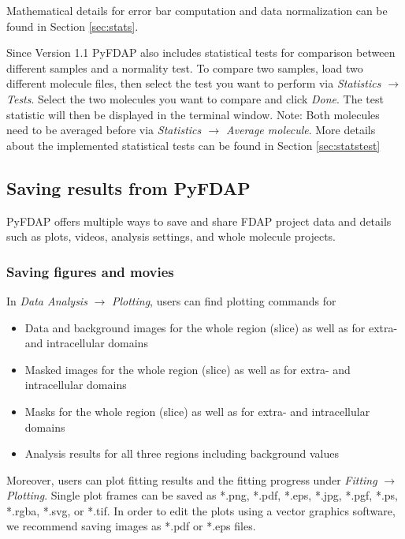 \documentclass[a4paper,11pt]{article}
\begin{document}
\noindent Mathematical details for error bar computation and data normalization can be found in Section \ref{sec:stats}.

Since Version 1.1 PyFDAP also includes statistical tests for comparison between different samples and a normality test. To compare two samples, load two different molecule files, then select the test you want
to perform via \textit{Statistics $\rightarrow$ Tests}. Select the two molecules you want to compare and click \textit{Done}. The test statistic will then be displayed in the terminal window. Note: Both molecules 
need to be averaged before via  \textit{Statistics $\rightarrow$ Average molecule}. More details about the implemented statistical tests can be found in Section \ref{sec:statstest}



\subsection{Saving results from PyFDAP}
\label{sec:output}
PyFDAP offers multiple ways to save and share FDAP project data and details such as plots, videos, analysis settings, and whole molecule projects. 

\subsubsection{Saving figures and movies}
\label{sec:movie}
In \textit{Data Analysis} $\rightarrow$ \textit{Plotting}, users can find plotting commands for
\begin{itemize}
 \item Data and background images for the whole region (slice) as well as for extra- and intracellular domains
 \item Masked images for the whole region (slice) as well as for extra- and intracellular domains
 \item Masks for the whole region (slice) as well as for extra- and intracellular domains
 \item Analysis results for all three regions including background values
\end{itemize}

\noindent Moreover, users can plot fitting results and the fitting progress under \textit{Fitting} $\rightarrow$ \textit{Plotting}. Single plot frames can be saved as *.png, *.pdf, *.eps, *.jpg, *.pgf, *.ps, *.rgba, *.svg, or *.tif. In order to edit the plots using a vector graphics software, we recommend saving images as *.pdf or *.eps files.
\end{document}
